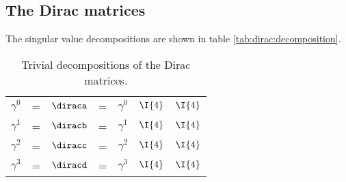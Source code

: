 \subsection{The Dirac matrices}
The singular value decompositions are shown in table \eqref{tab:dirac:decomposition}.
\begin{table}[htdp]
\caption[Trivial decompositions of the Dirac matrices]{Trivial decompositions of the Dirac matrices.}
\begin{center}
\begin{tabular}{ccccccc}
%
 && \head{*} \\\hline
%
 $\gamma^{0}$ & = & $\diraca$  
              & = & $\gamma^{0}$ & $\I{4}$ & $\I{4}$ \\
%
 $\gamma^{1}$ & = & $\diracb$  
              & = & $\gamma^{1}$ & $\I{4}$ & $\I{4}$ \\
%
 $\gamma^{2}$ & = & $\diracc$  
              & = & $\gamma^{2}$ & $\I{4}$ & $\I{4}$ \\
%
 $\gamma^{3}$ & = & $\diracd$  
              & = & $\gamma^{3}$ & $\I{4}$ & $\I{4}$ \\
%
\end{tabular}
\end{center}
\label{tab:dirac:decomposition}
\end{table}

\endinput